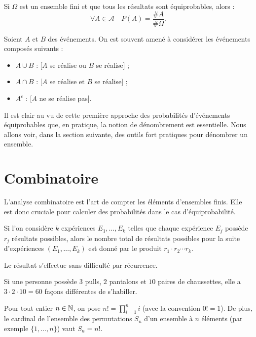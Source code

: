 \begin{proposition}
    Si $\Omega$ est un ensemble fini et que tous les résultats sont équiprobables, alors :
    \[
    \forall A\in \mathcal{A} \quad P(A) = \frac{\# A}{\#\Omega}.
    \]
\end{proposition}

\begin{remarque}
    Soient $A$ et $B$ des événements. On est souvent amené à considérer les événements composés suivants :
    \begin{itemize}
        \item $A\cup B$ : [$A$ se réalise ou $B$ se réalise] ;
        \item $A\cap B$ : [$A$ se réalise et $B$ se réalise] ;
        \item $A^c$ : [$A$ ne se réalise pas].
    \end{itemize}
\end{remarque}

Il est clair au vu de cette première approche des probabilités d'événements équiprobables que, en pratique, la notion de dénombrement est essentielle. Nous allons voir, dans la section suivante, des outils fort pratiques pour dénombrer un ensemble.

\section{Combinatoire}

L’analyse combinatoire est l’art de compter les éléments d’ensembles finis. Elle est donc cruciale pour calculer des probabilités dans le cas d’équiprobabilité.

\begin{proposition}
    Si l'on considère $k$ expériences $E_1,\dotsc,E_k$ telles que chaque expérience $E_j$ possède $r_j$ résultats possibles, alors le nombre total de résultats possibles pour la suite d'expériences $(E_1,\dots,E_k)$ est donné par le produit $r_1 \cdot r_2 \dotsm r_k$.
\end{proposition}

Le résultat s’effectue sans difficulté par récurrence.

 \begin{exemple}
     Si une personne possède $3$ pulls, $2$ pantalons et $10$ paires de chaussettes, elle a $3\cdot 2\cdot 10 = 60$ façons différentes de s'habiller.
 \end{exemple}  

 
 \begin{definition}  
     Pour tout entier $n\in \mathbb{N}$, on pose $n! = \prod_{i=1}^{n}i$ (avec la convention $0! = 1$). De plus, le cardinal de l'ensemble des permutations $S_n$ d'un ensemble à $n$ éléments (par exemple $\{1,\dotsc,n\}$) vaut $S_n = n!$.
 \end{definition}

